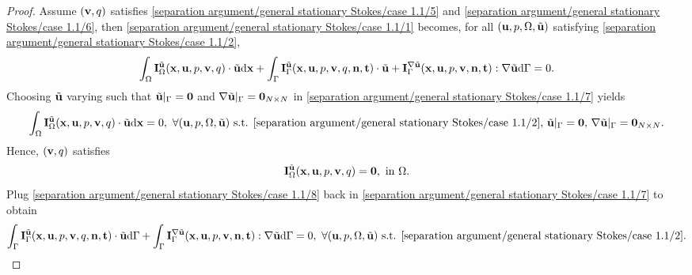 \documentclass[oneside,11pt]{book}
\numberwithin{equation}{section}
\begin{document}
\begin{enumerate}[leftmargin=0mm]
\begin{itemize}[leftmargin=0in]
\begin{proof}
            Assume $({\bf v},q)$ satisfies \eqref{separation argument/general stationary Stokes/case 1.1/5} and \eqref{separation argument/general stationary Stokes/case 1.1/6}, then \eqref{separation argument/general stationary Stokes/case 1.1/1} becomes, for all $({\bf u},p,\Omega,\tilde{\bf u})$ satisfying \eqref{separation argument/general stationary Stokes/case 1.1/2},
            \begin{align}
                \label{separation argument/general stationary Stokes/case 1.1/7}
                \int_\Omega {\bf I}_\Omega^{\tilde{\bf u}}({\bf x},{\bf u},p,{\bf v},q)\cdot\tilde{\bf u}{\rm d}{\bf x} + \int_\Gamma {\bf I}_\Gamma^{\tilde{\bf u}}({\bf x},{\bf u},p,{\bf v},q,{\bf n},{\bf t})\cdot\tilde{\bf u} + {\bf I}_\Gamma^{\nabla\tilde{\bf u}}({\bf x},{\bf u},p,{\bf v},{\bf n},{\bf t}):\nabla\tilde{\bf u}{\rm d}\Gamma = 0.
            \end{align}
            Choosing $\tilde{\bf u}$ varying such that $\tilde{\bf u}|_\Gamma = {\bf 0}$ and $\nabla\tilde{\bf u}|_\Gamma = {\bf 0}_{N\times N}$ in \eqref{separation argument/general stationary Stokes/case 1.1/7} yields
            \begin{align*}
                \int_\Omega {\bf I}_\Omega^{\tilde{\bf u}}({\bf x},{\bf u},p,{\bf v},q)\cdot\tilde{\bf u}{\rm d}{\bf x} = 0,\ \forall({\bf u},p,\Omega,\tilde{\bf u})\mbox{ s.t. \eqref{separation argument/general stationary Stokes/case 1.1/2}},\,\tilde{\bf u}|_\Gamma = {\bf 0},\,\nabla\tilde{\bf u}|_\Gamma = {\bf 0}_{N\times N}.
            \end{align*}
            Hence, $({\bf v},q)$ satisfies
            \begin{align}
                \label{separation argument/general stationary Stokes/case 1.1/8}
                {\bf I}_\Omega^{\tilde{\bf u}}({\bf x},{\bf u},p,{\bf v},q) = {\bf 0},\mbox{ in }\Omega.
            \end{align}
            Plug \eqref{separation argument/general stationary Stokes/case 1.1/8} back in \eqref{separation argument/general stationary Stokes/case 1.1/7} to obtain
            \begin{align*}
                \int_\Gamma {\bf I}_\Gamma^{\tilde{\bf u}}({\bf x},{\bf u},p,{\bf v},q,{\bf n},{\bf t})\cdot\tilde{\bf u}{\rm d}\Gamma + \int_\Gamma {\bf I}_\Gamma^{\nabla\tilde{\bf u}}({\bf x},{\bf u},p,{\bf v},{\bf n},{\bf t}):\nabla\tilde{\bf u}{\rm d}\Gamma = 0,\ \forall({\bf u},p,\Omega,\tilde{\bf u})\mbox{ s.t. \eqref{separation argument/general stationary Stokes/case 1.1/2}}.
            \end{align*}

\end{proof}
\end{itemize}
\end{enumerate}
\end{document}
